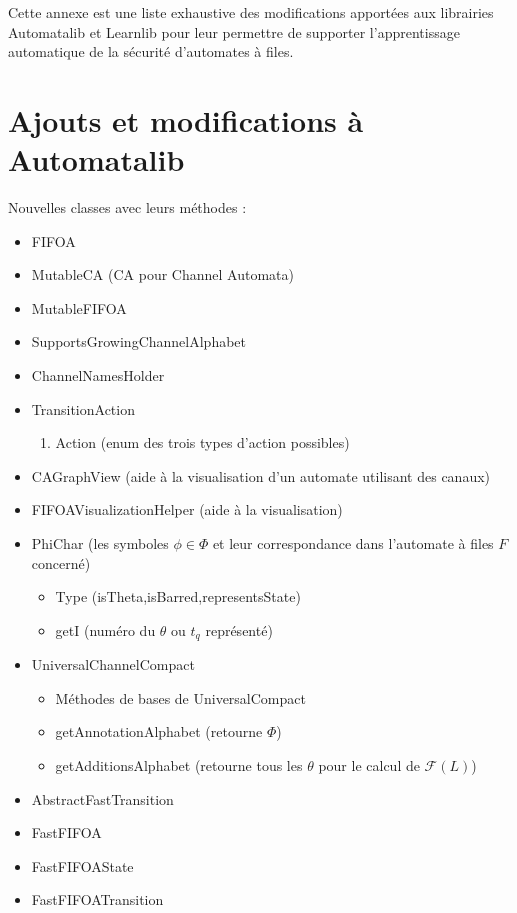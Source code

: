 Cette annexe est une liste exhaustive des modifications apportées aux librairies Automatalib et Learnlib pour leur permettre de supporter l'apprentissage automatique de la sécurité d'automates à files.

\section{Ajouts et modifications à Automatalib}
Nouvelles classes avec leurs méthodes :
\begin{itemize}
  \item FIFOA
  \item MutableCA (CA pour Channel Automata)
  \item MutableFIFOA
  \item SupportsGrowingChannelAlphabet
  \item ChannelNamesHolder
  \item TransitionAction
    \begin{enumerate}
      \item Action (enum des trois types d'action possibles)
    \end{enumerate}
  \item CAGraphView (aide à la visualisation d'un automate utilisant des canaux)
  \item FIFOAVisualizationHelper (aide à la visualisation)
  \item PhiChar (les symboles $\phi\in\Phi$ et leur correspondance dans l'automate à files $F$ concerné)
    \begin{itemize}
      \item Type (isTheta,isBarred,representsState)
      \item getI (numéro du $\theta$ ou $t_q$ représenté)
    \end{itemize}
  \item UniversalChannelCompact
    \begin{itemize}
      \item Méthodes de bases de UniversalCompact
      \item getAnnotationAlphabet (retourne $\Phi$)
      \item getAdditionsAlphabet (retourne tous les $\theta$ pour le calcul de $\mathcal{F}(L)$)
    \end{itemize}
  \item AbstractFastTransition
  \item FastFIFOA
  \item FastFIFOAState
  \item FastFIFOATransition

\end{itemize}

